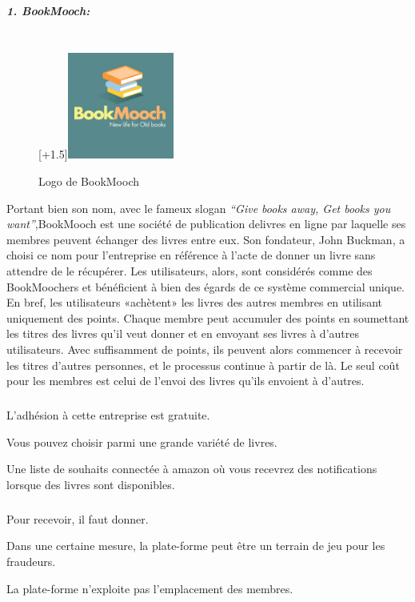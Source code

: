 \subparagraph{{\large 1. BookMooch:}\\\\}

\begin{figure}
	\raisebox{0pt}[\dimexpr\height+1.5\baselineskip\relax]{\includegraphics[width=3.5cm]{Images/chapter1/bookMoochLogo.jpg}}
	\caption{Logo de BookMooch}
\end{figure}

Portant bien son nom, avec le fameux slogan \textit{​“Give books away, Get books you want”},BookMooch est une société de publication delivres en ligne par laquelle ses membres peuvent échanger des livres entre eux. Son fondateur,
John Buckman, a choisi ce nom pour l'entreprise en référence à l'acte de donner un livre sans attendre de le récupérer. Les utilisateurs, alors, sont considérés comme des BookMoochers et bénéficient à bien des égards de ce système commercial unique.\\
\tab En bref, les utilisateurs «achètent» les livres des autres membres	en utilisant uniquement des points. Chaque membre peut accumuler des points en soumettant les titres des livres qu'il veut donner et en envoyant ses livres à d'autres utilisateurs. Avec suffisamment de points, ils peuvent alors commencer à recevoir les titres d'autres personnes, et le processus continue à partir de là. Le seul coût pour les membres est celui de l'envoi des livres qu'ils envoient à d'autres.\cite{noauthor_bookmooch_nodate}\\

\subparagraph*{}
\begin{list}{•}{\textbf{Avantages}}
	\item L'adhésion à cette entreprise est gratuite.
	\item Vous pouvez choisir parmi une grande variété de livres.
	\item Une liste de souhaits connectée à amazon où vous recevrez des notifications lorsque des livres sont disponibles.
\end{list}

\subparagraph*{}
\begin{list}{•}{\textbf{Inconvénients}}
	\item Pour recevoir, il faut donner.
	\item Dans une certaine mesure, la plate-forme peut être un terrain de jeu pour les fraudeurs.
	\item La plate-forme n'exploite pas l'emplacement des membres.
\end{list}

